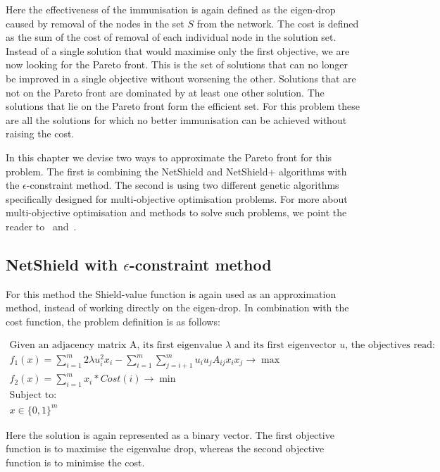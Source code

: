 \documentclass[11pt]{article}
\theoremstyle{definition}
\begin{document}
Here the effectiveness of the immunisation is again defined as the eigen-drop caused by removal of the nodes in the set $S$ from the network. The cost is defined as the sum of the cost of removal of each individual node in the solution set. Instead of a single solution that would maximise only the first objective, we are now looking for the Pareto front. This is the set of solutions that can no longer be improved in a single objective without worsening the other. Solutions that are not on the Pareto front are dominated by at least one other solution. The solutions that lie on the Pareto front form the efficient set. For this problem these are all the solutions for which no better immunisation can be achieved without raising the cost.

In this chapter we devise two ways to approximate the Pareto front for this problem. The first is combining the NetShield and NetShield+ algorithms with the $\epsilon$-constraint method. The second is using two different genetic algorithms specifically designed for multi-objective optimisation problems. For more about multi-objective optimisation and methods to solve such problems, we point the reader to~\cite{emmerich2018tutorial} and~\cite{KaisaNMO}.


\subsection{NetShield with $\epsilon$-constraint method}

For this method the Shield-value function is again used as an approximation method, instead of working directly on the eigen-drop. In combination with the cost function, the problem definition is as follows:

\begin{equation}
\begin{gathered}
\text{Given an adjacency matrix A, its first eigenvalue $\lambda$ and its first eigenvector $u$, the objectives read:}\\
f_{1}(x) = \sum_{i=1}^{m} 2 \lambda  u_{i}^{2} x_{i} - \sum_{i=1}^{m} \sum_{j=i+1}^{m} u_{i} u_{j} A_{ij}  x_{i} x_{j} \to \max \\
f_{2}(x) = \sum_{i=1}^{m} x_{i} * Cost(i) \to \min\\
\text{Subject to:}\\
x \in \{0,1\}^{m}
\end{gathered}
\end{equation}

Here the solution is again represented as a binary vector. The first objective function is to maximise the eigenvalue drop, whereas the second objective function is to minimise the cost.
\end{document}
